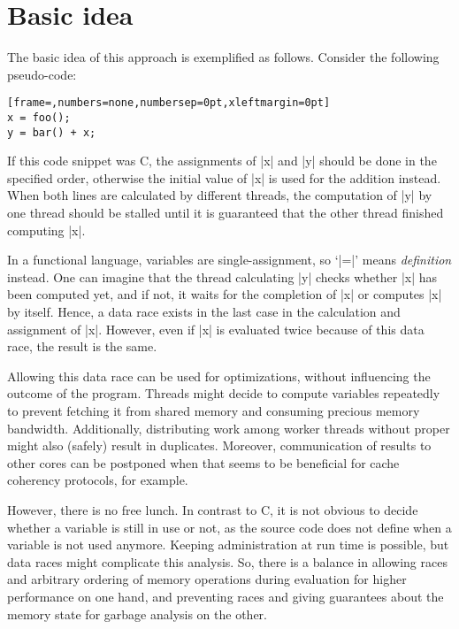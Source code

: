 \section{Basic idea}

The basic idea of this approach is exemplified as follows.
Consider the following pseudo-code:
\begin{lstlisting}[frame=,numbers=none,numbersep=0pt,xleftmargin=0pt]
x = foo();
y = bar() + x;
\end{lstlisting}
If this code snippet was C, the assignments of \lsticode|x| and \lsticode|y| should be done in the specified order, otherwise the initial value of \lsticode|x| is used for the addition instead.
When both lines are calculated by different threads, the computation of \lsticode|y| by one thread should be stalled until it is guaranteed that the other thread finished computing \lsticode|x|.

In a functional language, variables are single-assignment, so `\lsticode|=|' means \emph{definition} instead.
One can imagine that the thread calculating \lsticode|y| checks whether \lsticode|x| has been computed yet, and if not, it waits for the completion of \lsticode|x| or computes \lsticode|x| by itself.
Hence, a data race exists in the last case in the calculation and assignment of \lsticode|x|.
However, even if \lsticode|x| is evaluated twice because of this data race, the result is the same.

Allowing this data race can be used for optimizations, without influencing the outcome of the program.
Threads might decide to compute variables repeatedly to prevent fetching it from shared memory and consuming precious memory bandwidth. %
Additionally, distributing work among worker threads without proper  might also (safely) result in duplicates.
Moreover, communication of results to other cores can be postponed when that seems to be beneficial for cache coherency protocols, for example.

However, there is no free lunch.
In contrast to C, it is not obvious to decide whether a variable is still in use or not, as the source code does not define when a variable is not used anymore.
Keeping administration at run time is possible, but data races might complicate this analysis.
So, there is a balance in allowing races and arbitrary ordering of memory operations during evaluation for higher performance on one hand, and preventing races and giving guarantees about the memory state for garbage analysis on the other.

